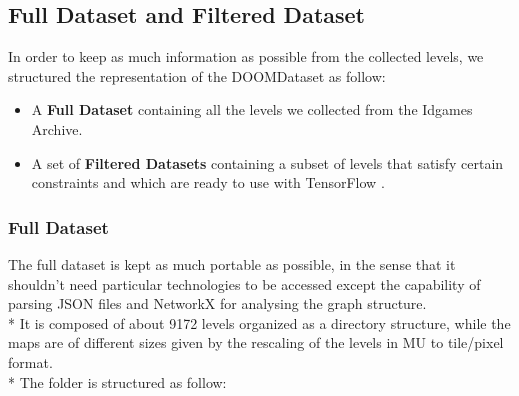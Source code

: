 \subsection{Full Dataset and Filtered Dataset}
In order to keep as much information as possible from the collected levels, we structured the representation of the DOOMDataset as follow:
\begin{itemize}
	\item  A \textbf{Full Dataset} containing all the levels we collected from the Idgames Archive.
	\item A set of \textbf{Filtered Datasets} containing a subset of levels that satisfy certain constraints and which are ready to use with TensorFlow \cite{tensorflow2015-whitepaper}.
\end{itemize}

\subsubsection{Full Dataset} 
 The full dataset is kept as much portable as possible, in the sense that it shouldn't need particular technologies to be accessed except the capability of parsing JSON files and NetworkX \cite{networkx} for analysing the graph structure. \\*
 It is composed of about 9172 levels organized as a directory structure, while the maps are of different sizes given by the rescaling of the levels in \gls{MU} to tile/pixel format.\\*
 The folder is structured as follow:

